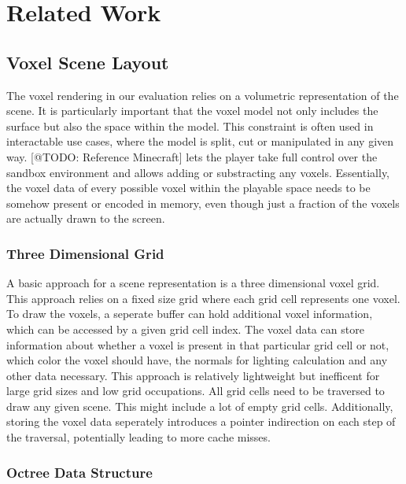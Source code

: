 \chapter{Related Work} \label{cpt-related-work}

\section{Voxel Scene Layout}

The voxel rendering in our evaluation relies on a volumetric representation of the scene.
It is particularly important that the voxel model not only includes the surface but also 
the space within the model. This constraint is often used in interactable use cases, where 
the model is split, cut or manipulated in any given way. [@TODO: Reference Minecraft] lets
the player take full control over the sandbox environment and allows adding or substracting 
any voxels. Essentially, the voxel data of every possible voxel within the playable space 
needs to be somehow present or encoded in memory, even though just a fraction of the voxels 
are actually drawn to the screen.\\

\subsection{Three Dimensional Grid} \label{subsec-three-dimensional-grid}

A basic approach for a scene representation is a three dimensional voxel grid. This 
approach relies on a fixed size grid where each grid cell represents one voxel.
To draw the voxels, a seperate buffer can hold additional voxel information, which 
can be accessed by a given grid cell index. The voxel data can store information about 
whether a voxel is present in that particular grid cell or not, which color the voxel 
should have, the normals for lighting calculation and any other data necessary.
This approach is relatively lightweight but inefficent for large grid sizes and low 
grid occupations. All grid cells need to be traversed to draw any given scene. This 
might include a lot of empty grid cells. Additionally, storing the voxel data seperately
introduces a pointer indirection on each step of the traversal, potentially leading to more 
cache misses.

\subsection{Octree Data Structure} \label{subsec-octree-data-structure}

